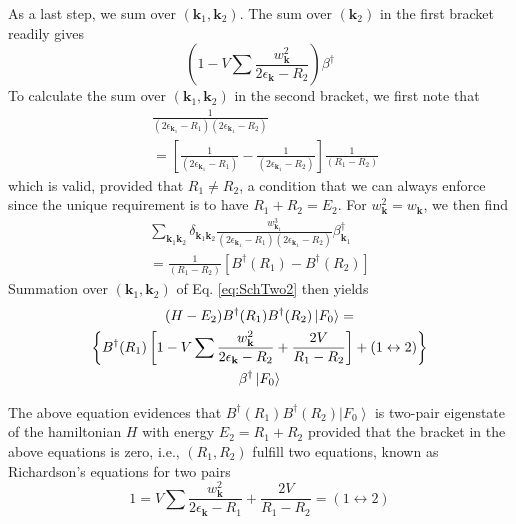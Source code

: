 \documentclass[aps,prb,superscriptaddress,showpacs,reprint,lengthcheck]{revtex4}
\newcommand{\vk}{\ensuremath{\mathbf{k}}}
\begin{document}
As a last step, we sum over $(\vk_1,\vk_2)$.  The sum over $(\vk_2)$ in the first bracket readily gives 
\begin{equation}\label{eq:1-v}
\left(1-V\sum\frac{w_{\mathbf{k} }^2}{2\epsilon_{\mathbf{k} }-R_2}\right)\beta^\dagger
\end{equation}
To calculate the sum over $(\vk_1,\vk_2)$ in the second bracket, we first note that
\begin{equation}\label{eq:inverse}
\begin{split}
&\frac{1}{\left(2\epsilon_{\mathbf{k} _1}-R_1\right)
\left(2\epsilon_{\mathbf{k} _1}-R_2\right)}\\&=\left[
\frac{1}{\left(2\epsilon_{\mathbf{k} _1}-R_1\right)}-\frac{1}{\left(2\epsilon_{\mathbf{k}
_1}-R_2\right) }\right]\frac1{\left(R_1-R_2\right) } 
\end{split}
\end{equation}
which is valid, provided that $R_1\neq{}R_2$,
a condition that we can always enforce since the unique requirement is to have $R_1+R_2=E_2$. For $w^2_{{\mathbf{k} }}=w_{{\mathbf{k} }}$, we then find 
\begin{multline}\label{eq:deltakk}
\sum_{{\mathbf{k} _1}{\mathbf{k} _2}}\delta_{{\mathbf{k} _1}{\mathbf{k} _2}}\frac{w^3_{{\mathbf{k} _1}}}{\left(2%
\epsilon_{\mathbf{k} _1}-R_1\right) \left(2\epsilon_{\mathbf{k}
_1}-R_2\right)}\beta^\dagger_{{\mathbf{k} _1}}\\=\frac1{\left(R_1-R_2\right) }[B^\dagger(R_1)-B^\dagger(R_2)]
\end{multline}
 Summation over $(\vk_1,\vk_2)$ of Eq. \eqref{eq:SchTwo2} then yields 
\begin{multline}  \label{eq:SchTwo3}
(H-E_2)B^{\dagger}(R_1)B^{\dagger}(R_2)\left|F_0\right>   = \\
\left\{B^{\dagger}(R_1)\left[1-V\sum\frac{w_{\mathbf{k} }^2}{2\epsilon_{%
\mathbf{k} }-R_2}+\frac{2V}{R_1-R_2}\right] +(1\leftrightarrow2)\right\}  \\
\beta^{\dagger}\left|F_0\right>  
\end{multline}


The above equation evidences that $B^{\dagger}(R_1)B^{\dagger}(R_2)%
\left|F_0\right>  $ is two-pair eigenstate of the hamiltonian $H$ with  energy $%
E _2=R_1+R_2$ provided that the bracket in the above equations is zero, i.e., $\left(R_1,R_2\right) $ fulfill two
equations, known as Richardson's equations for two pairs 
\begin{equation}
1=V\sum\frac{w_{\mathbf{k} }^2}{2\epsilon_{\mathbf{k} }-R_1}+\frac{2V}{R_1-R_2}%
=(1\leftrightarrow2)
\end{equation}
\end{document}

